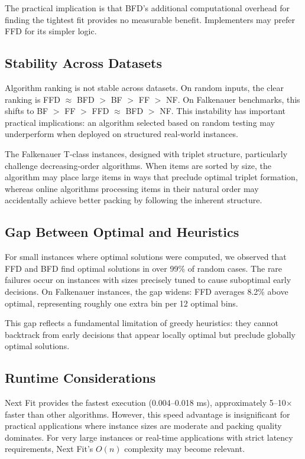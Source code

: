 \documentclass[11pt,a4paper]{article}
\begin{document}
The practical implication is that BFD's additional computational overhead for finding the tightest fit provides no measurable benefit. Implementers may prefer FFD for its simpler logic.

\subsection{Stability Across Datasets}

Algorithm ranking is not stable across datasets. On random inputs, the clear ranking is FFD $\approx$ BFD $>$ BF $>$ FF $>$ NF. On Falkenauer benchmarks, this shifts to BF $>$ FF $>$ FFD $\approx$ BFD $>$ NF. This instability has important practical implications: an algorithm selected based on random testing may underperform when deployed on structured real-world instances.

The Falkenauer T-class instances, designed with triplet structure, particularly challenge decreasing-order algorithms. When items are sorted by size, the algorithm may place large items in ways that preclude optimal triplet formation, whereas online algorithms processing items in their natural order may accidentally achieve better packing by following the inherent structure.

\subsection{Gap Between Optimal and Heuristics}

For small instances where optimal solutions were computed, we observed that FFD and BFD find optimal solutions in over 99\% of random cases. The rare failures occur on instances with sizes precisely tuned to cause suboptimal early decisions. On Falkenauer instances, the gap widens: FFD averages 8.2\% above optimal, representing roughly one extra bin per 12 optimal bins.

This gap reflects a fundamental limitation of greedy heuristics: they cannot backtrack from early decisions that appear locally optimal but preclude globally optimal solutions.

\subsection{Runtime Considerations}

Next Fit provides the fastest execution (0.004--0.018 ms), approximately 5--10$\times$ faster than other algorithms. However, this speed advantage is insignificant for practical applications where instance sizes are moderate and packing quality dominates. For very large instances or real-time applications with strict latency requirements, Next Fit's $O(n)$ complexity may become relevant.
\end{document}
